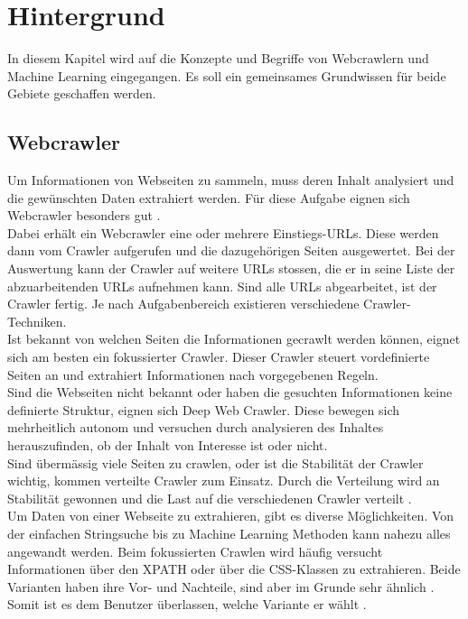 \section{Hintergrund}
In diesem Kapitel wird auf die Konzepte und Begriffe von Webcrawlern und Machine Learning eingegangen. Es soll ein gemeinsames Grundwissen für beide Gebiete geschaffen werden.
%
\subsection{Webcrawler}
Um Informationen von Webseiten zu sammeln, muss deren Inhalt analysiert und die gewünschten Daten extrahiert werden. Für diese Aufgabe eignen sich Webcrawler besonders gut \cite{scrapy_1, scrapy_2}.\\
Dabei erhält ein Webcrawler eine oder mehrere Einstiegs-URLs. Diese werden dann vom Crawler aufgerufen und die dazugehörigen Seiten ausgewertet. Bei der Auswertung kann der Crawler auf weitere URLs stossen, die er in seine Liste der abzuarbeitenden URLs aufnehmen kann. Sind alle URLs abgearbeitet, ist der Crawler fertig. Je nach Aufgabenbereich existieren verschiedene Crawler-Techniken.\\
Ist bekannt von welchen Seiten die Informationen gecrawlt werden können, eignet sich am besten ein fokussierter Crawler. Dieser Crawler steuert vordefinierte Seiten an und extrahiert Informationen nach vorgegebenen Regeln.\\
Sind die Webseiten nicht bekannt oder haben die gesuchten Informationen keine definierte Struktur, eignen sich Deep Web Crawler. Diese bewegen sich mehrheitlich autonom und versuchen durch analysieren des Inhaltes herauszufinden, ob der Inhalt von Interesse ist oder nicht.\\
Sind übermässig viele Seiten zu crawlen, oder ist die Stabilität der Crawler wichtig, kommen verteilte Crawler zum Einsatz. Durch die Verteilung wird an Stabilität gewonnen und die Last auf die verschiedenen Crawler verteilt \cite{scrapy_3}.\\[2ex]
%
Um Daten von einer Webseite zu extrahieren, gibt es diverse Möglichkeiten. Von der einfachen Stringsuche bis zu Machine Learning Methoden kann nahezu alles angewandt werden. Beim fokussierten Crawlen wird häufig versucht Informationen über den XPATH oder über die CSS-Klassen zu extrahieren. Beide Varianten haben ihre Vor- und Nachteile, sind aber im Grunde sehr ähnlich \cite{xpath_vs_css}. Somit ist es dem Benutzer überlassen, welche Variante er wählt \cite{xpath}.\\[2ex]
